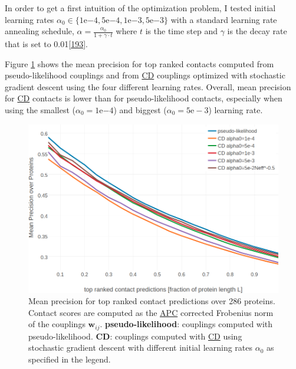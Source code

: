 \documentclass[11pt,a4paper,twoside]{book}
\newcommand{\eq}{\!=\!}
\newcommand{\wij}{\mathbf{w}_{ij}}
\theoremstyle{definition}
\theoremstyle{definition}
\theoremstyle{remark}
\begin{document}
In order to get a first intuition of the optimization problem, I tested
initial learning rates
\(\alpha_0 \in \{1\mathrm{e}{-4}, 5\mathrm{e}{-4}, 1\mathrm{e}{-3}, 5\mathrm{e}{-3}\}\)
with a standard learning rate annealing schedule,
\(\alpha = \frac{\alpha_0}{1 + \gamma \cdot t}\) where \(t\) is the time
step and \(\gamma\) is the decay rate that is set to
0.01{[}\protect\hyperlink{ref-Bottou2012}{193}{]}.

Figure \ref{fig:performance-cd-alphaopt} shows the mean precision for
top ranked contacts computed from pseudo-likelihood couplings and from
\protect\hyperlink{abbrev}{CD} couplings optimized with stochastic
gradient descent using the four different learning rates. Overall, mean
precision for \protect\hyperlink{abbrev}{CD} contacts is lower than for
pseudo-likelihood contacts, especially when using the smallest
(\(\alpha_0 \eq 1\mathrm{e}{-4}\)) and biggest
(\(\alpha_0 \eq 5\mathrm{e-}{3}\)) learning rate.










\begin{figure}

{\centering \includegraphics[width=0.9\linewidth]{img/full_likelihood/sgd/precision_vs_rank_learning_rates} 

}

\caption{Mean precision for top ranked
contact predictions over 286 proteins. Contact scores are computed as
the \protect\hyperlink{abbrev}{APC} corrected Frobenius norm of the
couplings \(\wij\). \textbf{pseudo-likelihood}: couplings computed with
pseudo-likelihood. \textbf{CD}: couplings computed with
\protect\hyperlink{abbrev}{CD} using stochastic gradient descent with
different initial learning rates \(\alpha_0\) as specified in the
legend.}\label{fig:performance-cd-alphaopt}
\end{figure}
\end{document}
